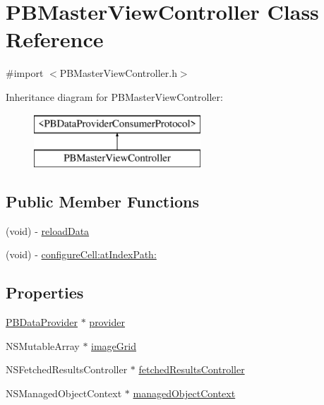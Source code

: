 \hypertarget{interface_p_b_master_view_controller}{
\section{PBMasterViewController Class Reference}
\label{interface_p_b_master_view_controller}
}


{\ttfamily \#import $<$PBMasterViewController.h$>$}

Inheritance diagram for PBMasterViewController:\begin{figure}[H]
\begin{center}
\leavevmode
\includegraphics[height=2cm]{interface_p_b_master_view_controller}
\end{center}
\end{figure}
\subsection*{Public Member Functions}
\begin{DoxyCompactItemize}
\item 
(void) -\/ \hyperlink{interface_p_b_master_view_controller_acb794e1bf10659381af948267f5d7db3}{reloadData}
\item 
(void) -\/ \hyperlink{interface_p_b_master_view_controller_aa68b0153bbe1a609854ca5309dceec04}{configureCell:atIndexPath:}
\end{DoxyCompactItemize}
\subsection*{Properties}
\begin{DoxyCompactItemize}
\item 
\hyperlink{interface_p_b_data_provider}{PBDataProvider} $\ast$ \hyperlink{interface_p_b_master_view_controller_a9cc98a5b2cbdf865d98ea86819807de4}{provider}
\item 
NSMutableArray $\ast$ \hyperlink{interface_p_b_master_view_controller_af1e58f8f35c598b9a0083fb119fdfa66}{imageGrid}
\item 
NSFetchedResultsController $\ast$ \hyperlink{interface_p_b_master_view_controller_a770ae0f08b365d8af9a206e04d22052f}{fetchedResultsController}
\item 
NSManagedObjectContext $\ast$ \hyperlink{interface_p_b_master_view_controller_adeebe5deeb50f760daa2b23db0a20d95}{managedObjectContext}
\end{DoxyCompactItemize}


